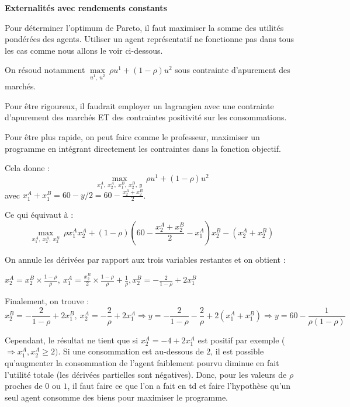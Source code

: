 \documentclass[11pt]{article}
\begin{document}
\textbf{Externalit\'{e}s avec rendements constants}

Pour d\'{e}terminer l'optimum de Pareto, il faut maximiser la somme des utilit\'{e}s pond\'{e}r\'{e}es des agents. Utiliser un agent repr\'{e}sentatif ne fonctionne pas dans tous les cas comme nous allons le voir ci-dessous.

On r\'{e}soud notamment  $\underset{u^1, \ u^2}{\max} \
 \rho u^1 + (1-\rho) u^2 $ sous contrainte d'apurement des march\'{e}s. 
 
Pour \^{e}tre rigoureux, il faudrait employer un lagrangien avec une contrainte d'apurement des march\'{e}s ET des contraintes positivit\'{e} sur les consommations.

Pour \^{e}tre plus rapide, on peut faire comme le professeur, maximiser un programme en int\'{e}grant directement les contraintes dans la fonction objectif. 

Cela donne : $$\underset{x^A_1, \ x^A_2, \ x^B_1, \ x^B_2, \ y}{\max} \
 \rho u^1 + (1-\rho) u^2  $$ avec $x^A_1+ x^B_1=60-y/2 = 60-\frac{x^A_2+x^B_2}{2}$.
 
Ce qui \'{e}quivaut \`{a} :$$\underset{x^A_1, \ x^A_2, \ x^B_2}{\max} \
 \rho x^A_1 x^A_2 + (1-\rho)(60-\frac{x^A_2+x^B_2}{2}-x^A_1) x^B_2 - (  x^A_2+ x^B_2) $$
 
 On annule les d\'{e}riv\'{e}es par rapport aux trois variables restantes et on obtient :
 
 $x^A_2 = x^B_2 \times \frac{1-\rho}{\rho}, \ x^A_1 = \frac{x^B_2}{2} \times \frac{1-\rho}{\rho} +\frac{1}{\rho}, x^B_2 =-\frac{2}{1-\rho}+ 2x^B_1$
 
 Finalement, on trouve : $$x^B_2 =-\frac{2}{1-\rho}+ 2x^B_1, \ x^A_2 =-\frac{2}{\rho}+ 2x^A_1 \Rightarrow y =- \frac{2}{1-\rho}-\frac{2}{\rho} + 2(x^A_1+x^B_1) \Rightarrow y = 60-\frac{1}{\rho(1-\rho)}   $$
 
 Cependant, le r\'{e}sultat ne tient que si $x^A_2 =-4+ 2x^A_1$ est positif par exemple ($ \Rightarrow x^A_1,x^A_2 \geq 2) $. Si une consommation est au-dessous de 2, il est possible qu'augmenter la consommation de l'agent faiblement pourvu diminue en fait l'utilit\'{e} totale (les  d\'{e}riv\'{e}es partielles sont n\'{e}gatives). Donc, pour les valeurs de $\rho$ proches de $0$ ou $1$, il faut faire ce que l'on a fait en td et faire l'hypoth\`{e}se qu'un seul agent consomme des biens pour maximiser le programme.
 
 
 
\end{document}
